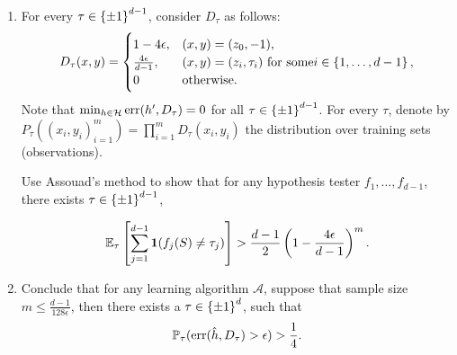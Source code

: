 \documentclass{article}
\DeclareMathOperator*{\err}{{\rm err}}
\DeclareMathOperator*{\U}{{\rm U}}
\newcommand{\EE}{\mathbb{E}} %
\newcommand{\PP}{\mathbb{P}} %
\newcommand{\Acal}{\mathcal{A}} %
\newcommand{\Hcal}{\mathcal{H}} %
\newcommand*{\one}{{\bf 1}}
\begin{document}
\begin{enumerate}

\item For every $\tau \in \cbr{\pm 1}^{d-1}$, consider $D_{\tau}$ as follows:
\[ D_{\tau}(x,y) = \begin{cases} 1-4\epsilon, & (x,y) = (z_0, -1), \\
                                \frac{4\epsilon}{d-1}, & (x,y) = (z_i, \tau_i) \text{ for some} i \in \cbr{1,\ldots,d-1}, \\
                                0 & \text{otherwise.} \end{cases} \]
Note that $\min_{h \in \Hcal} \err(h', D_\tau) = 0$ for all $\tau \in \cbr{\pm 1}^{d-1}$.
For every $\tau$, denote by $P_\tau((x_i,y_i)_{i=1}^m) = \prod_{i=1}^m D_\tau(x_i, y_i)$ the distribution over training sets (observations).


Use Assouad's method to show that for any hypothesis tester $f_1, \ldots, f_{d-1}$, there exists $\tau \in \cbr{\pm 1}^{d-1}$,


\[ \EE_\tau \sbr{\sum_{j=1}^{d-1} \one(f_j(S) \neq \tau_j)} > \frac {d-1} 2 \del{1-\frac{4\epsilon}{d-1}}^m. \]


\item Conclude that for any learning algorithm $\Acal$, suppose that sample size $m \leq \frac{d-1}{128\epsilon}$, then there exists a $\tau \in \cbr{\pm 1}^d$, such that
\[  \PP_\tau( \err(\hat{h}, D_\tau) > \epsilon) > \frac14. \]

\end{enumerate}
\end{document}
